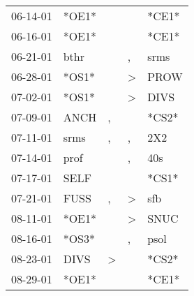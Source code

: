 \begin{supertabular}{p{0.07\textwidth}p{0.06\textwidth}p{0.02\textwidth}p{0.02\textwidth}p{0.06\textwidth}}
          06-14-01\textsuperscript{} &                            *OE1* &                  &                  &                            *CE1* \\
          06-16-01\textsuperscript{} &                            *OE1* &                  &                  &                            *CE1* \\
          06-21-01\textsuperscript{} &           bthr\textsuperscript{} &                  &                , &           srms\textsuperscript{} \\
          06-28-01\textsuperscript{} &                            *OS1* &                  &     \textgreater &           PROW\textsuperscript{} \\
          07-02-01\textsuperscript{} &                            *OS1* &                  &     \textgreater &           DIVS\textsuperscript{} \\
          07-09-01\textsuperscript{} &           ANCH\textsuperscript{} &                , &                  &                            *CS2* \\
          07-11-01\textsuperscript{} &           srms\textsuperscript{} &                , &                , &            2X2\textsuperscript{} \\
          07-14-01\textsuperscript{} &           prof\textsuperscript{} &                  &                , &            40s\textsuperscript{} \\
          07-17-01\textsuperscript{} &           SELF\textsuperscript{} &                  &                  &                            *CS1* \\
          07-21-01\textsuperscript{} &           FUSS\textsuperscript{} &                , &     \textgreater &            sfb\textsuperscript{} \\
          08-11-01\textsuperscript{} &                            *OE1* &                  &     \textgreater &           SNUC\textsuperscript{} \\
          08-16-01\textsuperscript{} &                            *OS3* &                  &                , &           psol\textsuperscript{} \\
          08-23-01\textsuperscript{} &           DIVS\textsuperscript{} &     \textgreater &                  &                            *CS2* \\
          08-29-01\textsuperscript{} &                            *OE1* &                  &                  &                            *CE1* \\

\end{supertabular}
